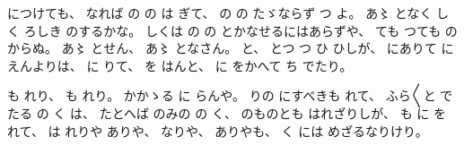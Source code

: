 につけても、
%
なれば
の
の
は
ぎて、
%
の
の
たゞならず
つ
よ。
%
あ〻
となく
しく
ろしき
のするかな。
%
しくは
の
の
とかなせるにはあらずや、
%
ても
つても
の
からぬ。
%
あ〻
とせん、
%
あ〻
となさん。
%
と、
%
とつ
つ
ひ
ひしが、
%
にありて
に
えんよりは、
%
に
りて、
%
を
はんと、
%
に
をかへて
ち
でたり。

も
れり、
%
も
れり。
%
かかゝる
に
らんや。
%
りの
にすべきも
れて、
%
ふら〳〵と
でたる
の
く
は、
%
たとへば
のみの
の
く、
%
のものとも
はれざりしが、
%
も
に
を
れて、
%
は
れりや
ありや、
%
なりや、
%
ありやも、
%
く
には
めざるなりけり。

